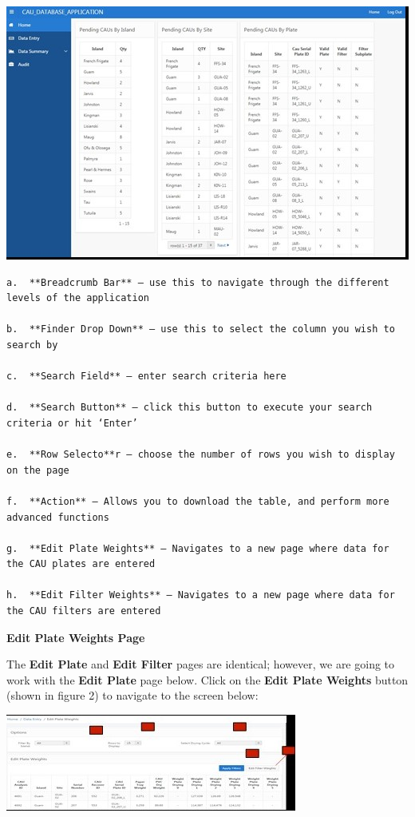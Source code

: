 \documentclass[
]{book}
\begin{document}
\includegraphics{images/Data2.jpg}

\begin{verbatim}
a.  **Breadcrumb Bar** – use this to navigate through the different levels of the application  

b.  **Finder Drop Down** – use this to select the column you wish to search by  

c.  **Search Field** – enter search criteria here  

d.  **Search Button** – click this button to execute your search criteria or hit ‘Enter’  

e.  **Row Selecto**r – choose the number of rows you wish to display on the page  

f.  **Action** – Allows you to download the table, and perform more advanced functions  

g.  **Edit Plate Weights** – Navigates to a new page where data for the CAU plates are entered  

h.  **Edit Filter Weights** – Navigates to a new page where data for the CAU filters are entered  
\end{verbatim}

\textbf{Edit Plate Weights Page}

The \textbf{Edit Plate} and \textbf{Edit Filter} pages are identical; however, we are going to work with the \textbf{Edit Plate} page below. Click on the \textbf{Edit Plate Weights} button (shown in figure 2) to navigate to the screen below:

\includegraphics{images/Data3.jpg}
\end{document}
